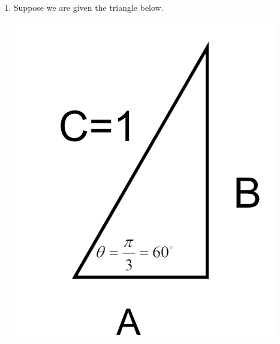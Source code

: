 \documentclass[nooutcomes,handout]{ximera}
\begin{document}
\begin{problem}
\begin{enumerate}
\begin{enumerate}
\begin{freeResponse}
	\end{freeResponse}
	\end{enumerate}

	\item Suppose we are given the triangle below.  
		\begin{image}
		\includegraphics[scale=.5]{figure3.png}
		\end{image}


\end{enumerate}
\end{problem}
\end{document}
